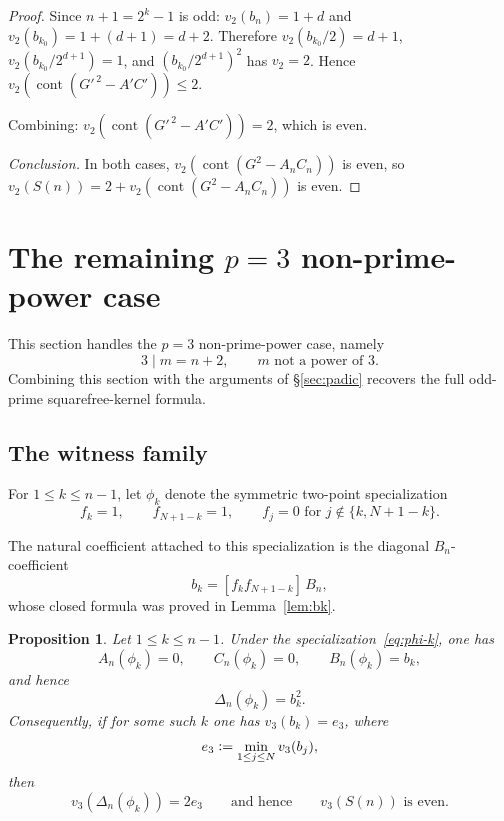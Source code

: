 \documentclass[10pt]{amsart}
\newtheorem{proposition}[theorem]{Proposition}
\theoremstyle{definition}
\theoremstyle{remark}
\DeclareMathOperator{\cont}{cont}
\newcommand{\defeq}{\vcentcolon=}
\begin{document}
\begin{proof}
Since $n{+}1 = 2^k{-}1$ is odd:
$v_2(b_n) = 1 + d$ and $v_2(b_{k_0}) = 1 + (d+1) = d + 2$.
Therefore $v_2(b_{k_0}/2) = d+1$,
$v_2(b_{k_0}/2^{d+1}) = 1$, and $(b_{k_0}/2^{d+1})^2$ has $v_2 = 2$.
Hence $v_2(\cont(G'^{\,2}-A'C'))\le 2$.

\smallskip
Combining: $v_2(\cont(G'^{\,2}-A'C'))=2$, which is even.

\medskip\noindent\emph{Conclusion.}
In both cases, $v_2(\cont(G^2-A_nC_n))$ is even, so
$v_2(S(n))=2+v_2(\cont(G^2-A_nC_n))$ is even.
\end{proof}

\section{The remaining $p=3$ non-prime-power case}
\label{sec:p3-draft}

This section handles the $p=3$ non-prime-power case, namely
\[
3 \mid m=n+2,\qquad m \text{ not a power of } 3.
\]
Combining this section with the arguments of \S\ref{sec:padic} recovers
the full odd-prime squarefree-kernel formula.

\subsection{The witness family}

For $1 \le k \le n-1$, let $\phi_k$ denote the symmetric two-point
specialization
\begin{equation}\label{eq:phi-k}
f_k = 1,\qquad f_{N+1-k}=1,\qquad f_j = 0 \text{ for } j \notin \{k,N+1-k\}.
\end{equation}

The natural coefficient attached to this specialization is the diagonal
$B_n$-coefficient
\[
b_k = [f_k f_{N+1-k}]\,B_n,
\]
whose closed formula was proved in Lemma~\ref{lem:bk}.

\begin{proposition}\label{prop:p3-pair-reduction}
Let $1 \le k \le n-1$.  Under the specialization~\eqref{eq:phi-k},
one has
\[
A_n(\phi_k)=0,\qquad C_n(\phi_k)=0,\qquad B_n(\phi_k)=b_k,
\]
and hence
\[
\Delta_n(\phi_k)=b_k^2.
\]
Consequently, if for some such $k$ one has $v_3(b_k)=e_3$, where
\[
e_3 \defeq \min_{1 \le j \le N} v_3(b_j),
\]
then
\[
v_3(\Delta_n(\phi_k)) = 2e_3
\qquad\text{and hence}\qquad
v_3(S(n)) \text{ is even.}
\]
\end{proposition}
\end{document}
